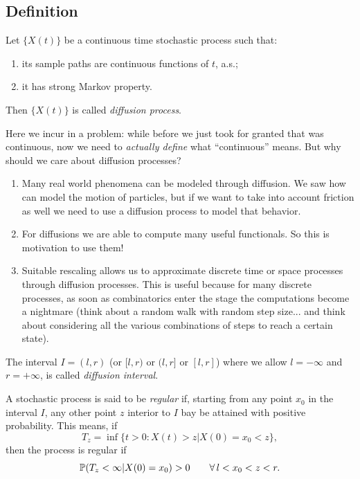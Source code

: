 \documentclass[12pt]{report}
\begin{document}
\subsection{Definition}
\begin{definition}
	Let $\{X(t)\}$ be a continuous time stochastic process such that:
	\begin{enumerate}
		\item its sample paths are continuous functions of $t$, a.s.;
		\item it has strong Markov property.
	\end{enumerate}
	Then $\{X(t)\}$ is called \emph{diffusion process}.
\end{definition}
Here we incur in a problem: while before we just took for granted that \bwm{} was continuous, now we need to \textit{actually define} what ``continuous'' means. But why should we care about diffusion processes?
\begin{enumerate}
	\item Many real world phenomena can be modeled through diffusion. We saw how \bwm{} can model the motion of particles, but if we want to take into account friction as well we need to use a diffusion process to model that behavior.
	\item For diffusions we are able to compute many useful functionals. So this is motivation to use them!
	\item Suitable rescaling allows us to approximate discrete time or space processes through diffusion processes. This is useful because for many discrete processes, as soon as combinatorics enter the stage the computations become a nightmare (think about a random walk with random step size... and think about considering all the various combinations of steps to reach a certain state).
\end{enumerate}
\begin{definition}
	The interval $I=(l,r)$ (or $[l,r)$ or $(l,r]$ or $[l,r]$) where we allow $l=-\infty$ and $r=+\infty$, is called \emph{diffusion interval}.
\end{definition}
\begin{definition}
	A stochastic process is said to be \emph{regular} if, starting from any point $x_{0}$ in the interval $I$, any other point $z$ interior to $I$ bay be attained with positive probability. This means, if 
	\begin{equation*}
		T_{z}=\inf\{t>0:X(t)>z|X(0)=x_{0}<z\},
	\end{equation*}
	then the process is regular if
	\begin{equation*}
		\mathbb{P}(T_{z}<\infty|X(0)=x_{0})>0\qquad\forall\, l<x_{0}<z<r.
	\end{equation*}
\end{definition}
\end{document}
